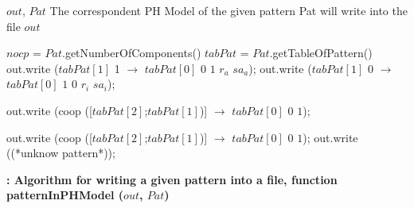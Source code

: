 
\begin{algorithm}
\begin{algorithmic}[1]

\REQUIRE $out$, $Pat$ 
\ENSURE The correspondent PH Model of the given pattern Pat will write into the file $out$

\STATE $nocp$ = $Pat$.getNumberOfComponents() 
\STATE $tabPat$ = $Pat$.getTableOfPattern() 
  \STATE out.write ($tabPat[1]$ 1 $\rightarrow$ $tabPat[0]$ $0$ $1$ $r_{a}$ $sa_{a}$);       
\ENDCASE
{}
  \STATE out.write ($tabPat[1]$ 0 $\rightarrow$ $tabPat[0]$ $1$ $0$ $r_{i}$ $sa_{i}$);    

\ENDSWITCH
   
   
\ENDCASE

   \STATE out.write (coop ([$tabPat[2]$;$tabPat[1]$)] $\rightarrow$ $tabPat[0]$ $0$ $1$); 
        
\ENDCASE
{}
  \STATE out.write (coop ([$tabPat[2]$;$tabPat[1]$)] $\rightarrow$ $tabPat[0]$ $0$ $1$); 
\DEFAULT
 \STATE out.write ((*unknow pattern*));
 \ENDDEFAULT
\ENDSWITCH
   
   
\ENDCASE

\ENDSWITCH

\end{algorithmic}
\caption{\bf: Algorithm for writing a given pattern into a file, function patternInPHModel ($out$, $Pat$)} \label{PHModelGeneration}
\end{algorithm}







